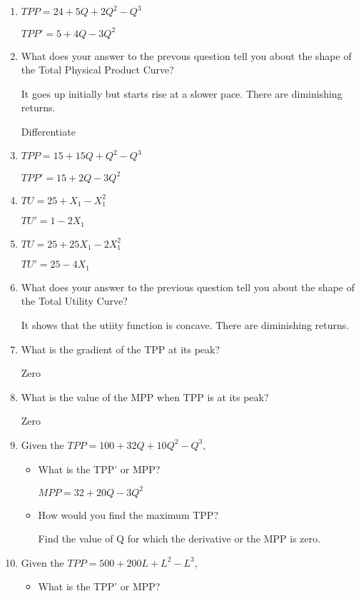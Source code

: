 \documentclass[12pt, a4paper, oneside]{article}\usepackage[]{graphicx}\usepackage[]{color}
\begin{document}
\begin{enumerate}
\item $TPP = 24 +5Q +2Q^2 - Q^3$

$TPP' =  5 +4Q - 3Q^2$

\item What does your answer to the prevous question tell you about the shape of the Total Physical Product Curve? 

It goes up initially but starts rise at a slower pace.  There are diminishing returns.  

Differentiate

\item $TPP = 15 +15Q +Q^2 - Q^3$

$TPP' = 15 + 2Q - 3Q^2$

\item $TU = 25 + X_1 - X_1^2$

$TU' = 1 - 2X_1$

\item $TU = 25 +25X_1 -2X_1^2$

$TU' = 25 - 4X_1$

\item What does your answer to the previous question tell you about the shape of the Total Utility Curve? 

It shows that the utiity function is concave.  There are diminishing returns. 


\item What is the gradient of the TPP at its peak? 

Zero

\item What is the value of the MPP when TPP is at its peak? 

Zero

\item Given the $TPP = 100 + 32Q +10Q^2 - Q^3$, 
\begin{itemize}
\item What is the TPP' or MPP?

$MPP = 32 +20Q - 3Q^2$

\item How would you find the maximum TPP?

Find the value of Q for which the derivative or the MPP is zero. 
\end{itemize}

\item Given the $TPP = 500 + 200L + L^2 - L^3$, 
\begin{itemize}
\item What is the TPP' or MPP?


\end{itemize}
\end{enumerate}
\end{document}

